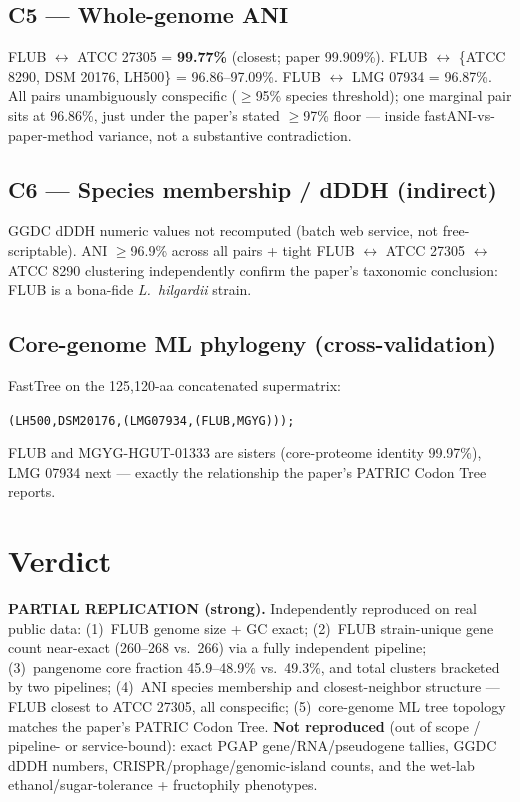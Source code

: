 \documentclass[11pt,letterpaper]{article}
\begin{document}
\subsection{C5 --- Whole-genome ANI}
FLUB $\leftrightarrow$ ATCC 27305 = \textbf{99.77\%} (closest; paper 99.909\%). FLUB $\leftrightarrow$ \{ATCC 8290, DSM 20176, LH500\} = 96.86--97.09\%. FLUB $\leftrightarrow$ LMG 07934 = 96.87\%. All pairs unambiguously conspecific ($\ge$95\% species threshold); one marginal pair sits at 96.86\%, just under the paper's stated $\ge$97\% floor --- inside fastANI-vs-paper-method variance, not a substantive contradiction.

\subsection{C6 --- Species membership / dDDH (indirect)}
GGDC dDDH numeric values not recomputed (batch web service, not free-scriptable). ANI $\ge$96.9\% across all pairs + tight FLUB $\leftrightarrow$ ATCC 27305 $\leftrightarrow$ ATCC 8290 clustering independently confirm the paper's taxonomic conclusion: FLUB is a bona-fide \emph{L.\ hilgardii} strain.

\subsection{Core-genome ML phylogeny (cross-validation)}
FastTree on the 125{,}120-aa concatenated supermatrix:
\begin{center}\texttt{(LH500,DSM20176,(LMG07934,(FLUB,MGYG)));}\end{center}
FLUB and MGYG-HGUT-01333 are sisters (core-proteome identity 99.97\%), LMG 07934 next --- exactly the relationship the paper's PATRIC Codon Tree reports.

\section{Verdict}
\textbf{PARTIAL REPLICATION (strong).} Independently reproduced on real public data: (1)~FLUB genome size + GC exact; (2)~FLUB strain-unique gene count near-exact (260--268 vs.\ 266) via a fully independent pipeline; (3)~pangenome core fraction 45.9--48.9\% vs.\ 49.3\%, and total clusters bracketed by two pipelines; (4)~ANI species membership and closest-neighbor structure --- FLUB closest to ATCC 27305, all conspecific; (5)~core-genome ML tree topology matches the paper's PATRIC Codon Tree. \textbf{Not reproduced} (out of scope / pipeline- or service-bound): exact PGAP gene/RNA/pseudogene tallies, GGDC dDDH numbers, CRISPR/prophage/genomic-island counts, and the wet-lab ethanol/sugar-tolerance + fructophily phenotypes.
\end{document}
